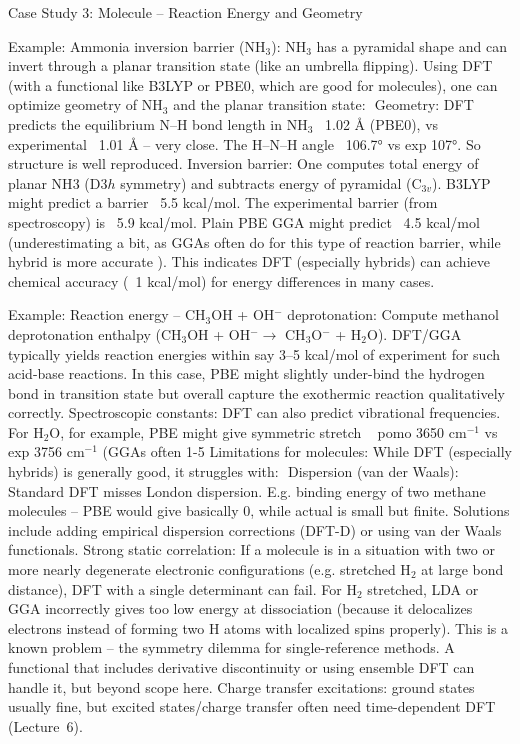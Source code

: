 \begin{frame}{Case Study 3: Molecule – Reaction Energy and Geometry}

Example: Ammonia inversion barrier (NH$_3$): NH$_3$ has a pyramidal shape and can invert through a planar transition state (like an umbrella flipping). Using DFT (with a functional like B3LYP or PBE0, which are good for molecules), one can optimize geometry of NH$_3$ and the planar transition state: 
Geometry: DFT predicts the equilibrium N–H bond length in NH$_3$ ~1.02 Å (PBE0), vs experimental ~1.01 Å – very close. The H–N–H angle ~106.7° vs exp 107°. So structure is well reproduced.
Inversion barrier: One computes total energy of planar NH$3$ (D${3h}$ symmetry) and subtracts energy of pyramidal (C$_{3v}$). B3LYP might predict a barrier ~5.5 kcal/mol. The experimental barrier (from spectroscopy) is ~5.9 kcal/mol. Plain PBE GGA might predict ~4.5 kcal/mol (underestimating a bit, as GGAs often do for this type of reaction barrier, while hybrid is more accurate ).
This indicates DFT (especially hybrids) can achieve chemical accuracy (~1 kcal/mol) for energy differences in many cases.

Example: Reaction energy – CH$_3$OH + OH$^-$ deprotonation: Compute methanol deprotonation enthalpy (CH$_3$OH + OH$^-$$\to$ CH$_3$O$^-$ + H$_2$O). DFT/GGA typically yields reaction energies within say 3–5 kcal/mol of experiment for such acid-base reactions. In this case, PBE might slightly under-bind the hydrogen bond in transition state but overall capture the exothermic reaction qualitatively correctly.
Spectroscopic constants: DFT can also predict vibrational frequencies. For H$_2$O, for example, PBE might give symmetric stretch ~ pomo 3650 cm$^{-1}$ vs exp 3756 cm$^{-1}$ (GGAs often 1-5%
Limitations for molecules: While DFT (especially hybrids) is generally good, it struggles with: 
Dispersion (van der Waals): Standard DFT misses London dispersion. E.g. binding energy of two methane molecules – PBE would give basically 0, while actual is small but finite. Solutions include adding empirical dispersion corrections (DFT-D) or using van der Waals functionals.
Strong static correlation: If a molecule is in a situation with two or more nearly degenerate electronic configurations (e.g. stretched H$_2$ at large bond distance), DFT with a single determinant can fail. For H$_2$ stretched, LDA or GGA incorrectly gives too low energy at dissociation (because it delocalizes electrons instead of forming two H atoms with localized spins properly). This is a known problem – the symmetry dilemma for single-reference methods. A functional that includes derivative discontinuity or using ensemble DFT can handle it, but beyond scope here.
Charge transfer excitations: ground states usually fine, but excited states/charge transfer often need time-dependent DFT (Lecture 6).


\end{frame}
